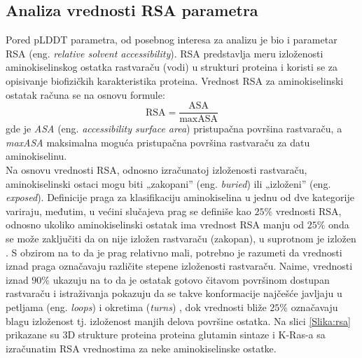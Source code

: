 \documentclass[a4paper,12pt]{article}
\begin{document}
\subsection{Analiza vrednosti RSA parametra}
Pored pLDDT parametra, od posebnog interesa za analizu je bio i parametar RSA (eng. \textit{relative solvent accessibility}). RSA predstavlja meru izloženosti aminokiselinskog ostatka rastvaraču (vodi) u strukturi proteina i koristi se za opisivanje biofizičkih karakteristika proteina. Vrednost RSA za aminokiselinski ostatak računa se na osnovu formule:
\begin{equation}
\text{RSA} = \frac{\text{ASA}}{\text{maxASA}}
\end{equation}
gde je \textit{ASA} (eng. \textit{accessibility surface area}) pristupačna površina rastvaraču, a \textit{maxASA} maksimalna moguća pristupačna površina rastvaraču za datu aminokiselinu. \\
Na osnovu vrednosti RSA, odnosno izračunatoj izloženosti rastvaraču, aminokiselinski ostaci mogu biti „zakopani” (eng. \textit{buried}) ili „izloženi” (eng. \textit{exposed}). Definicije praga za klasifikaciju aminokiselina u jednu od dve kategorije variraju, međutim, u većini slučajeva prag se definiše kao $25\%$ vrednosti RSA, odnosno ukoliko aminokiselinski ostatak ima vrednost RSA manju od $25\%$ onda se može zaključiti da on nije izložen rastvaraču (zakopan), u suprotnom je izložen \cite{wu2020rsa}. S obzirom na to da je prag relativno mali, potrebno je razumeti da vrednosti iznad praga označavaju različite stepene izloženosti rastvaraču. Naime, vrednosti iznad $90\%$ ukazuju na to da je ostatak gotovo čitavom površinom dostupan rastvaraču i istraživanja pokazuju da se takve konformacije najčešće javljaju u petljama (eng. \textit{loops}) i okretima (\textit{turns}) \cite{tien2013maxasa}, dok vrednosti bliže $25\%$ označavaju blagu izloženost tj. izloženost manjih delova površine ostatka. Na slici \ref{Slika:rsa} prikazane su 3D strukture proteina proteina glutamin sintaze i K-Ras-a sa izračunatim RSA vrednostima za neke aminokiselinske ostatke. 
\end{document}
